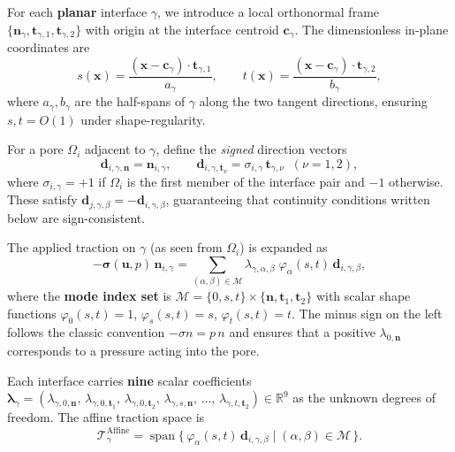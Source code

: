 \documentclass[11pt,a4paper]{article}
\newcommand{\R}{\mathbb{R}}
\newcommand{\pore}[1]{\Omega_{#1}}
\newcommand{\vel}{\bm{u}}
\newcommand{\pres}{p}
\newcommand{\stress}{\bm{\sigma}}
\newcommand{\normal}{\bm{n}}
\newcommand{\trac}{\bm{\lambda}}
\newcommand{\modeset}{\mathcal{M}}
\begin{document}
For each \textbf{planar} interface $\gamma$, we introduce a local
orthonormal frame $\{\normal_\gamma, \bm{t}_{\gamma,1},
\bm{t}_{\gamma,2}\}$ with origin at the interface centroid
$\bm{c}_\gamma$.  The dimensionless in-plane coordinates are
\begin{equation}\label{eq:local-coords}
  s(\bm{x}) = \frac{(\bm{x} - \bm{c}_\gamma) \cdot
    \bm{t}_{\gamma,1}}{a_\gamma},\qquad
  t(\bm{x}) = \frac{(\bm{x} - \bm{c}_\gamma) \cdot
    \bm{t}_{\gamma,2}}{b_\gamma},
\end{equation}
where $a_\gamma, b_\gamma$ are the half-spans of $\gamma$ along the two
tangent directions, ensuring $s,t = O(1)$ under shape-regularity.

For a pore $\pore{i}$ adjacent to $\gamma$, define the \emph{signed}
direction vectors
\begin{equation}\label{eq:signed-dir}
  \bm{d}_{i,\gamma,\normal} = \normal_{i,\gamma},\qquad
  \bm{d}_{i,\gamma,\bm{t}_\nu} = \sigma_{i,\gamma}\,\bm{t}_{\gamma,\nu}
  \;\;(\nu=1,2),
\end{equation}
where $\sigma_{i,\gamma}=+1$ if $\pore{i}$ is the first member of the
interface pair and $-1$ otherwise.  These satisfy
$\bm{d}_{j,\gamma,\beta} = -\bm{d}_{i,\gamma,\beta}$, guaranteeing
that continuity conditions written below are sign-consistent.

The applied traction on $\gamma$ (as seen from $\pore{i}$) is expanded as
\begin{equation}\label{eq:affine-traction}
  -\stress(\vel,\pres)\,\normal_{i,\gamma}
  = \sum_{(\alpha,\beta)\in\modeset}
    \lambda_{\gamma,\alpha,\beta}\;
    \varphi_\alpha(s,t)\,\bm{d}_{i,\gamma,\beta},
\end{equation}
where the \textbf{mode index set} is
$\modeset = \{0,s,t\} \times \{\normal,\bm{t}_1,\bm{t}_2\}$
with scalar shape functions
$\varphi_0(s,t) = 1$, $\varphi_s(s,t) = s$, $\varphi_t(s,t) = t$.
The minus sign on the left follows the classic convention
$-\sigma n = p\,n$ and ensures that a positive $\lambda_{0,\normal}$
corresponds to a pressure acting into the pore.

Each interface carries \textbf{nine} scalar coefficients
$\trac_\gamma = (\lambda_{\gamma,0,\normal},\,
\lambda_{\gamma,0,\bm{t}_1},\,\lambda_{\gamma,0,\bm{t}_2},\,
\lambda_{\gamma,s,\normal},\,\dots,\,
\lambda_{\gamma,t,\bm{t}_2}) \in \R^9$
as the unknown degrees of freedom.
The affine traction space is
\[
  \mathcal{T}_\gamma^{\text{Affine}} = \operatorname{span}\{\,
    \varphi_\alpha(s,t)\,\bm{d}_{i,\gamma,\beta}
    \mid (\alpha,\beta) \in \modeset \,\}.
\]
\end{document}
